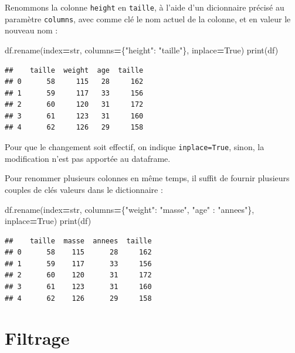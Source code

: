 \documentclass[
  12pt,
]{book}
\newenvironment{Shaded}{\begin{snugshade}}{\end{snugshade}}
\newcommand{\BuiltInTok}[1]{#1}
\newcommand{\NormalTok}[1]{#1}
\newcommand{\OperatorTok}[1]{\textcolor[rgb]{0.81,0.36,0.00}{\textbf{#1}}}
\newcommand{\StringTok}[1]{\textcolor[rgb]{0.31,0.60,0.02}{#1}}
\newcommand{\VariableTok}[1]{\textcolor[rgb]{0.00,0.00,0.00}{#1}}
\numberwithin{equation}{section}
\numberwithin{countremarque}{section}
\begin{document}
Renommons la colonne \texttt{height} en \texttt{taille}, à l'aide d'un dicionnaire précisé au paramètre \texttt{columns}, avec comme clé le nom actuel de la colonne, et en valeur le nouveau nom :

\begin{Shaded}
\begin{Highlighting}[]
\NormalTok{df.rename(index}\OperatorTok{=}\BuiltInTok{str}\NormalTok{, columns}\OperatorTok{=}\NormalTok{\{}\StringTok{"height"}\NormalTok{: }\StringTok{"taille"}\NormalTok{\}, inplace}\OperatorTok{=}\VariableTok{True}\NormalTok{)}
\BuiltInTok{print}\NormalTok{(df)}
\end{Highlighting}
\end{Shaded}

\begin{lstlisting}
##    taille  weight  age  taille
## 0      58     115   28     162
## 1      59     117   33     156
## 2      60     120   31     172
## 3      61     123   31     160
## 4      62     126   29     158
\end{lstlisting}

Pour que le changement soit effectif, on indique \texttt{inplace=True}, sinon, la modification n'est pas apportée au dataframe.

Pour renommer plusieurs colonnes en même temps, il suffit de fournir plusieurs couples de clés valeurs dans le dictionnaire :

\begin{Shaded}
\begin{Highlighting}[]
\NormalTok{df.rename(index}\OperatorTok{=}\BuiltInTok{str}\NormalTok{,}
\NormalTok{          columns}\OperatorTok{=}\NormalTok{\{}\StringTok{"weight"}\NormalTok{: }\StringTok{"masse"}\NormalTok{, }\StringTok{"age"}\NormalTok{ : }\StringTok{"annees"}\NormalTok{\},}
\NormalTok{          inplace}\OperatorTok{=}\VariableTok{True}\NormalTok{)}
\BuiltInTok{print}\NormalTok{(df)}
\end{Highlighting}
\end{Shaded}

\begin{lstlisting}
##    taille  masse  annees  taille
## 0      58    115      28     162
## 1      59    117      33     156
## 2      60    120      31     172
## 3      61    123      31     160
## 4      62    126      29     158
\end{lstlisting}

\section{Filtrage}\label{filtrage}
\end{document}
